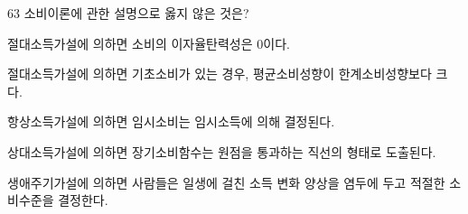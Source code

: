 \begin{question}{63}
소비이론에 관한 설명으로 옳지 않은 것은?
\begin{choices}
  \item 절대소득가설에 의하면 소비의 이자율탄력성은 0이다.
  \item 절대소득가설에 의하면 기초소비가 있는 경우, 평균소비성향이 한계소비성향보다 크다.
  \item 항상소득가설에 의하면 임시소비는 임시소득에 의해 결정된다.
  \item 상대소득가설에 의하면 장기소비함수는 원점을 통과하는 직선의 형태로 도출된다.
  \item 생애주기가설에 의하면 사람들은 일생에 걸친 소득 변화 양상을 염두에 두고 적절한 소비수준을 결정한다.
\end{choices}
\end{question}
